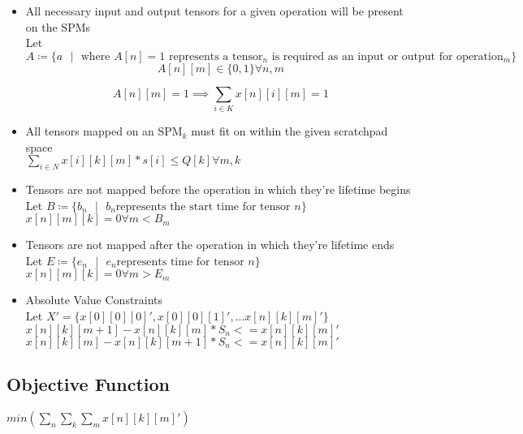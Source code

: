 \documentclass{article}
\begin{document}
\begin{itemize}
	\item All necessary input and output tensors for a given operation will be present on the SPMs\\

		Let $A \coloneqq \{ a \text{ } | \text{ } \text{where } A[n] = 1\text{ represents a tensor$_n$ is required as an input or output for operation$_m$} \}$\\
		\[
			A[n][m] \in \{0, 1\} \forall n,m
		\]

		\[
			A[n][m] = 1 \implies \sum_{i \in K} x[n][i][m] = 1 
		\]

	\item All tensors mapped on an SPM$_k$ must fit on within the given scratchpad space\\

		$\sum_{i \in N} {x[i][k][m] * s[i]} \leq Q[k] \forall m,k$\\

	\item Tensors are not mapped before the operation in which they're lifetime begins \\

		Let $B \coloneqq \{ b_n \text{ } | \text{ }  b_n \text{represents the start time for tensor $n$}\}$ \\

		$x[n][m][k] = 0 \forall m < B_m$

	\item Tensors are not mapped after the operation in which they're lifetime ends \\

		Let $E \coloneqq \{ e_n \text{ } | \text{ }  e_n \text{represents time for tensor $n$}\}$ \\

		$x[n][m][k]= 0 \forall m > E_m$

	\item Absolute Value Constraints\\
		Let $X\prime = \{ x[0][0][0]\prime, x[0][0][1]\prime, ... x[n][k][m]\prime\}$\\
		$x[n][k][m+1] - x[n][k][m] * S_n <= x[n][k][m]\prime$\\
		$x[n][k][m] - x[n][k][m + 1] * S_n <= x[n][k][m]\prime$\\

\end{itemize}


\subsection{Objective Function}

$min(\sum_n \sum_k \sum_m x[n][k][m]\prime)$
\end{document}
